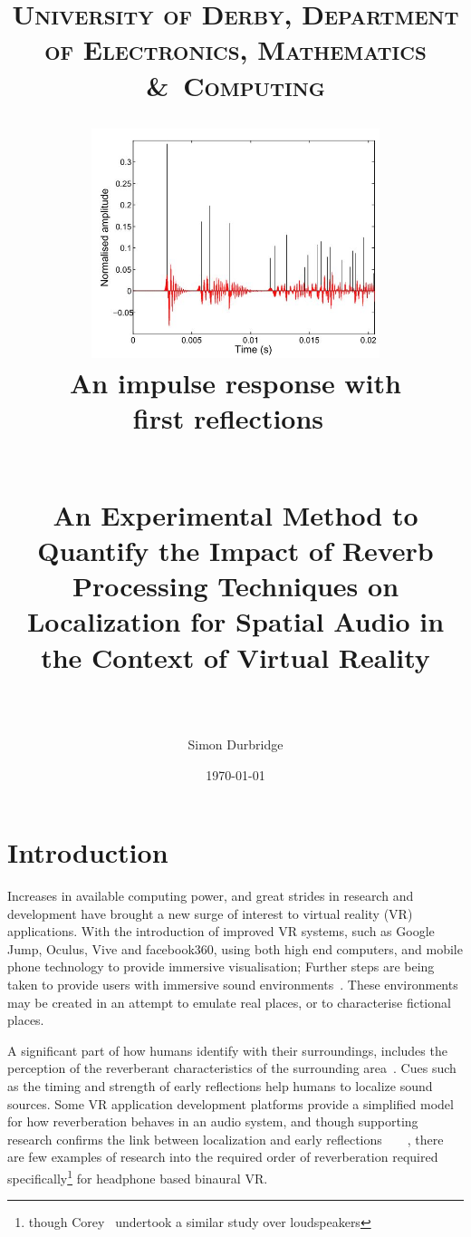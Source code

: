 \documentclass[paper=a4, fontsize=10pt, font=arial]{scrartcl} %
\title{	
\normalfont \normalsize 
\textsc{University of Derby, Department of Electronics, Mathematics \&\ Computing} \\ [25pt] %
\begin{figure}[H]
\centering
\includegraphics[width=0.75\textwidth]{impulseresponse.jpg}
\centering
\caption{An impulse response with first reflections~\cite{Mourik2013}}
\end{figure}
\horrule{0.5pt} \\[0.4cm] %
\huge An Experimental Method to Quantify the Impact of Reverb Processing Techniques on Localization for Spatial Audio in the Context of Virtual Reality \\ %
\horrule{2pt} \\[0.5cm] %
}
\author{Simon Durbridge} %
\date{\normalsize\today} %
\numberwithin{equation}{section} %
\numberwithin{figure}{section} %
\numberwithin{table}{section} %
\begin{document}
\maketitle %


\tableofcontents



\listoffigures

\newpage





\section{Introduction}

Increases in available computing power, and great strides in research and development have brought a new surge of interest to virtual reality (VR) applications. 
With the introduction of improved VR systems, such as Google Jump, Oculus, Vive and facebook360, using both high end computers, and mobile phone technology to provide immersive visualisation; Further steps are being taken to provide users with immersive sound environments~\cite{OculusCo41online}. 
These environments may be created in an  attempt to emulate real places, or to characterise fictional places.\par

A significant part of how humans identify with their surroundings, includes the perception of the reverberant characteristics of the surrounding area~\cite{rumsey2012spatial}. 
Cues such as the timing and strength of early reflections help humans to localize sound sources. 
Some VR application development platforms provide a simplified model for how reverberation behaves in an audio system, and though supporting research confirms the link between localization and early reflections~\cite{Begault1995}~\cite{rumsey2012spatial}~\cite{Blauert1997}~\cite{Wiggins2004}, there are few examples of research into the required order of reverberation required specifically\footnote{though Corey~\cite{Corey2002} undertook a similar study over loudspeakers} for headphone based binaural VR.\par
\end{document}
